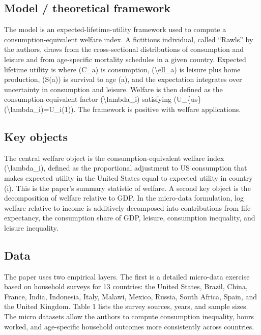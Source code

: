\documentclass[11pt,a4paper]{article}
\begin{document}
\subsection*{Model / theoretical framework}
The model is an expected-lifetime-utility framework used to compute a consumption-equivalent welfare index. A fictitious individual, called “Rawls” by the authors, draws from the cross-sectional distributions of consumption and leisure and from age-specific mortality schedules in a given country. Expected lifetime utility is where (C\_a) is consumption, (\textbackslash{}ell\_a) is leisure plus home production, (S(a)) is survival to age (a), and the expectation integrates over uncertainty in consumption and leisure. Welfare is then defined as the consumption-equivalent factor (\textbackslash{}lambda\_i) satisfying (U\_\{us\}(\textbackslash{}lambda\_i)=U\_i(1)). The framework is positive with welfare applications.

\subsection*{Key objects}
The central welfare object is the consumption-equivalent welfare index (\textbackslash{}lambda\_i), defined as the proportional adjustment to US consumption that makes expected utility in the United States equal to expected utility in country (i). This is the paper’s summary statistic of welfare. A second key object is the decomposition of welfare relative to GDP. In the micro-data formulation, log welfare relative to income is additively decomposed into contributions from life expectancy, the consumption share of GDP, leisure, consumption inequality, and leisure inequality.

\subsection*{Data}
The paper uses two empirical layers. The first is a detailed micro-data exercise based on household surveys for 13 countries: the United States, Brazil, China, France, India, Indonesia, Italy, Malawi, Mexico, Russia, South Africa, Spain, and the United Kingdom. Table 1 lists the survey sources, years, and sample sizes. The micro datasets allow the authors to compute consumption inequality, hours worked, and age-specific household outcomes more consistently across countries.
\end{document}
